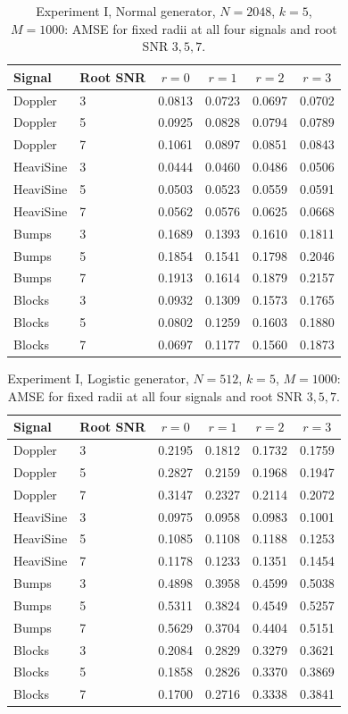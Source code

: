 \documentclass[11pt]{article}
\numberwithin{equation}{section}
\begin{document}
\begin{table}[H]
\centering\small
\caption{Experiment I, Normal generator, $N=2048$, $k=5$, $M=1000$: AMSE for fixed radii at all four signals and root SNR $3,5,7$.}
\label{tab:s5-e1-normal-2048}
\setlength{\tabcolsep}{5pt}
\begin{tabular}{llcccc}
\toprule
Signal & Root SNR & $r=0$ & $r=1$ & $r=2$ & $r=3$ \\
\midrule
Doppler & 3 & 0.0813 & 0.0723 & 0.0697 & 0.0702 \\
Doppler & 5 & 0.0925 & 0.0828 & 0.0794 & 0.0789 \\
Doppler & 7 & 0.1061 & 0.0897 & 0.0851 & 0.0843 \\
HeaviSine & 3 & 0.0444 & 0.0460 & 0.0486 & 0.0506 \\
HeaviSine & 5 & 0.0503 & 0.0523 & 0.0559 & 0.0591 \\
HeaviSine & 7 & 0.0562 & 0.0576 & 0.0625 & 0.0668 \\
Bumps & 3 & 0.1689 & 0.1393 & 0.1610 & 0.1811 \\
Bumps & 5 & 0.1854 & 0.1541 & 0.1798 & 0.2046 \\
Bumps & 7 & 0.1913 & 0.1614 & 0.1879 & 0.2157 \\
Blocks & 3 & 0.0932 & 0.1309 & 0.1573 & 0.1765 \\
Blocks & 5 & 0.0802 & 0.1259 & 0.1603 & 0.1880 \\
Blocks & 7 & 0.0697 & 0.1177 & 0.1560 & 0.1873 \\
\bottomrule
\end{tabular}
\end{table}

\begin{table}[H]
\centering\small
\caption{Experiment I, Logistic generator, $N=512$, $k=5$, $M=1000$: AMSE for fixed radii at all four signals and root SNR $3,5,7$.}
\label{tab:s5-e1-logistic-512}
\setlength{\tabcolsep}{5pt}
\begin{tabular}{llcccc}
\toprule
Signal & Root SNR & $r=0$ & $r=1$ & $r=2$ & $r=3$ \\
\midrule
Doppler & 3 & 0.2195 & 0.1812 & 0.1732 & 0.1759 \\
Doppler & 5 & 0.2827 & 0.2159 & 0.1968 & 0.1947 \\
Doppler & 7 & 0.3147 & 0.2327 & 0.2114 & 0.2072 \\
HeaviSine & 3 & 0.0975 & 0.0958 & 0.0983 & 0.1001 \\
HeaviSine & 5 & 0.1085 & 0.1108 & 0.1188 & 0.1253 \\
HeaviSine & 7 & 0.1178 & 0.1233 & 0.1351 & 0.1454 \\
Bumps & 3 & 0.4898 & 0.3958 & 0.4599 & 0.5038 \\
Bumps & 5 & 0.5311 & 0.3824 & 0.4549 & 0.5257 \\
Bumps & 7 & 0.5629 & 0.3704 & 0.4404 & 0.5151 \\
Blocks & 3 & 0.2084 & 0.2829 & 0.3279 & 0.3621 \\
Blocks & 5 & 0.1858 & 0.2826 & 0.3370 & 0.3869 \\
Blocks & 7 & 0.1700 & 0.2716 & 0.3338 & 0.3841 \\
\bottomrule
\end{tabular}
\end{table}
\end{document}
